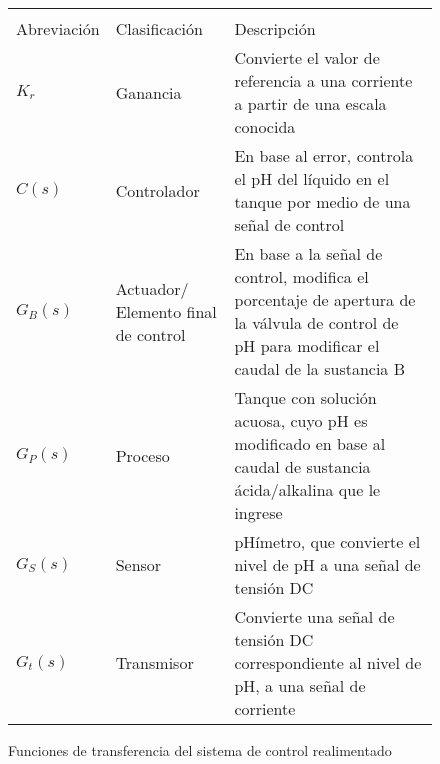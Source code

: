 \begin{figure}[!h]
    \centering
    \setlength\extrarowheight{3mm}
    \begin{tabular}{p{3cm}p{3cm}p{10cm}}
        \toprule\\[-2.5em]
        Abreviación & Clasificación & Descripción\\
        \midrule
        $K_r$ & Ganancia & Convierte el valor de referencia a una corriente a partir de una escala conocida\\
        $C(s)$ & Controlador & En base al error, controla el pH del líquido en el tanque por medio de una señal de control\\
        $G_B(s)$ & Actuador/ \newline Elemento final de control & En base a la señal de control, modifica el porcentaje de apertura de la válvula de control de pH para modificar el caudal de la sustancia B\\
        $G_P(s)$ & Proceso & Tanque con solución acuosa, cuyo pH es modificado en base al caudal de sustancia ácida/alkalina que le ingrese\\
        $G_S(s)$ & Sensor & pHímetro, que convierte el nivel de pH a una señal de tensión DC\\
        $G_t(s)$ & Transmisor & Convierte una señal de tensión DC correspondiente al nivel de pH, a una señal de corriente\\
        \bottomrule
    \end{tabular}
    \caption{Funciones de transferencia del sistema de control realimentado}
    \label{t2}
\end{figure}

